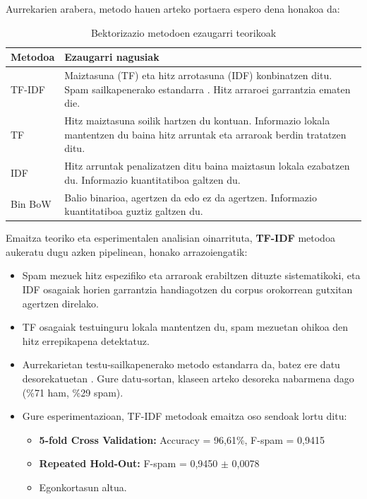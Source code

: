 \documentclass[12pt, a4paper]{article}
\begin{document}
Aurrekarien arabera, metodo hauen arteko portaera espero dena honakoa da:

\begin{table}[H]
    \centering
    \caption{Bektorizazio metodoen ezaugarri teorikoak}
    \begin{tabular}{lp{9cm}}
        \toprule
        \textbf{Metodoa} & \textbf{Ezaugarri nagusiak} \\
        \midrule
        TF-IDF   & Maiztasuna (TF) eta hitz arrotasuna (IDF) konbinatzen ditu. Spam sailkapenerako estandarra \cite{manning2008}. Hitz arraroei garrantzia ematen die. \\
        \addlinespace
        TF       & Hitz maiztasuna soilik hartzen du kontuan. Informazio lokala mantentzen du baina hitz arruntak eta arraroak berdin tratatzen ditu. \\
        \addlinespace
        IDF      & Hitz arruntak penalizatzen ditu baina maiztasun lokala ezabatzen du. Informazio kuantitatiboa galtzen du. \\
        \addlinespace
        Bin BoW  & Balio binarioa, agertzen da edo ez da agertzen. Informazio kuantitatiboa guztiz galtzen du. \\
        \bottomrule
    \end{tabular}
    \label{tab:bektorizazio}
\end{table}

Emaitza teoriko eta esperimentalen analisian oinarrituta, \textbf{TF-IDF} metodoa aukeratu dugu azken pipelinean, honako arrazoiengatik:

\begin{itemize}
    \item Spam mezuek hitz espezifiko eta arraroak erabiltzen dituzte sistematikoki, eta IDF osagaiak horien garrantzia handiagotzen du corpus orokorrean gutxitan agertzen direlako.
    \item TF osagaiak testuinguru lokala mantentzen du, spam mezuetan ohikoa den hitz errepikapena detektatuz.
    
    \item Aurrekarietan testu-sailkapenerako metodo estandarra da, batez ere datu desorekatuetan \cite{manning2008, salton1988}. Gure datu-sortan, klaseen arteko desoreka nabarmena dago (\%71 ham, \%29 spam).
    
    \item Gure esperimentazioan, TF-IDF metodoak emaitza oso sendoak lortu ditu:
          \begin{itemize}
              \item \textbf{5-fold Cross Validation:} Accuracy = 96,61\%, F-spam = 0,9415
              \item \textbf{Repeated Hold-Out:} F-spam = 0,9450 $\pm$ 0,0078
              \item Egonkortasun altua.
          \end{itemize}
\end{itemize}
\end{document}
